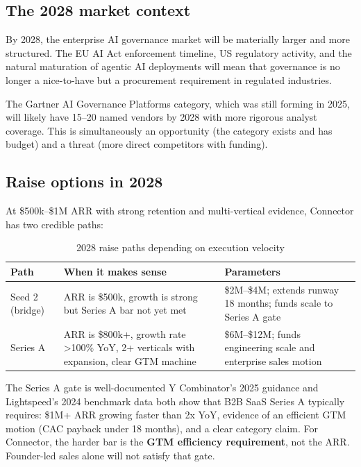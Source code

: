 \subsection{The 2028 market context}

By 2028, the enterprise AI governance market will be materially larger and
more structured. The EU AI Act enforcement timeline, US regulatory activity, and
the natural maturation of agentic AI deployments will mean that governance is no
longer a nice-to-have but a procurement requirement in regulated industries.

The Gartner AI Governance Platforms category, which was still forming in 2025,
will likely have 15--20 named vendors by 2028 with more rigorous analyst
coverage. This is simultaneously an opportunity (the category exists and has
budget) and a threat (more direct competitors with funding).

\subsection{Raise options in 2028}

At \$500k--\$1M ARR with strong retention and multi-vertical evidence,
Connector has two credible paths:

\begin{table}[H]
\centering
\renewcommand{\arraystretch}{1.45}
\begin{tabularx}{\textwidth}{@{}lXX@{}}
\toprule
\textbf{Path} & \textbf{When it makes sense} & \textbf{Parameters} \\
\midrule
Seed 2 (bridge) & ARR is \$500k, growth is strong but Series A bar not yet met & \$2M--\$4M; extends runway 18 months; funds scale to Series A gate \\
Series A & ARR is \$800k+, growth rate \textgreater{}100\% YoY, 2+ verticals with expansion, clear GTM machine & \$6M--\$12M; funds engineering scale and enterprise sales motion \\
\bottomrule
\end{tabularx}
\caption{2028 raise paths depending on execution velocity}
\end{table}

\begin{insightbox}{The Series A gate is well-documented}
Y Combinator's 2025 guidance and Lightspeed's 2024 benchmark data both show that
B2B SaaS Series A typically requires: \$1M+ ARR growing faster than 2x YoY,
evidence of an efficient GTM motion (CAC payback under 18 months), and a clear
category claim. For Connector, the harder bar is the \textbf{GTM efficiency
requirement}, not the ARR. Founder-led sales alone will not satisfy that gate.
\end{insightbox}

